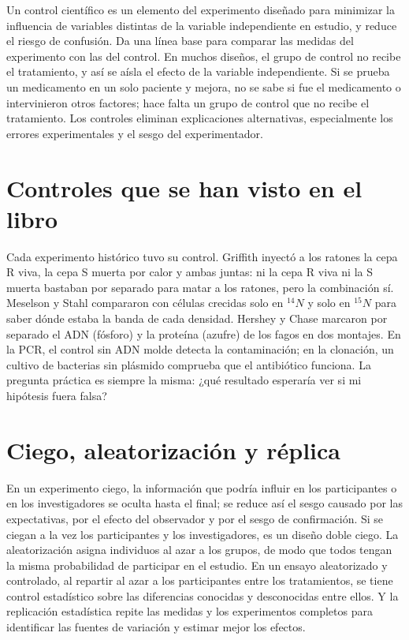 \documentclass{book}
\begin{document}
Un control científico es un elemento del experimento diseñado para minimizar la influencia de variables distintas de la variable independiente en estudio, y reduce el riesgo de confusión. Da una línea base para comparar las medidas del experimento con las del control. En muchos diseños, el grupo de control no recibe el tratamiento, y así se aísla el efecto de la variable independiente. Si se prueba un medicamento en un solo paciente y mejora, no se sabe si fue el medicamento o intervinieron otros factores; hace falta un grupo de control que no recibe el tratamiento. Los controles eliminan explicaciones alternativas, especialmente los errores experimentales y el sesgo del experimentador.


\section{Controles que se han visto en el libro}

Cada experimento histórico tuvo su control. Griffith inyectó a los ratones la cepa R viva, la cepa S muerta por calor y ambas juntas: ni la cepa R viva ni la S muerta bastaban por separado para matar a los ratones, pero la combinación sí. Meselson y Stahl compararon con células crecidas solo en \({}^{14}N\) y solo en \({}^{15}N\) para saber dónde estaba la banda de cada densidad. Hershey y Chase marcaron por separado el ADN (fósforo) y la proteína (azufre) de los fagos en dos montajes. En la PCR, el control sin ADN molde detecta la contaminación; en la clonación, un cultivo de bacterias sin plásmido comprueba que el antibiótico funciona. La pregunta práctica es siempre la misma: ¿qué resultado esperaría ver si mi hipótesis fuera falsa?


\section{Ciego, aleatorización y réplica}

En un experimento ciego, la información que podría influir en los participantes o en los investigadores se oculta hasta el final; se reduce así el sesgo causado por las expectativas, por el efecto del observador y por el sesgo de confirmación. Si se ciegan a la vez los participantes y los investigadores, es un diseño doble ciego. La aleatorización asigna individuos al azar a los grupos, de modo que todos tengan la misma probabilidad de participar en el estudio. En un ensayo aleatorizado y controlado, al repartir al azar a los participantes entre los tratamientos, se tiene control estadístico sobre las diferencias conocidas y desconocidas entre ellos. Y la replicación estadística repite las medidas y los experimentos completos para identificar las fuentes de variación y estimar mejor los efectos.
\end{document}
